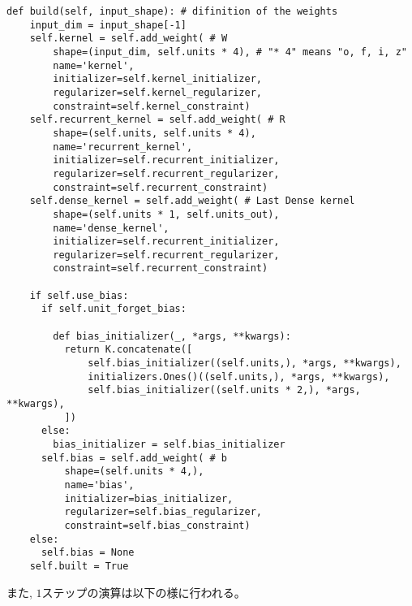 \begin{lstlisting}[caption=独自のリカレントニューラルネットワーク構造の$1$ステップ, label=VLSTMCellSimple]
  def build(self, input_shape): # difinition of the weights
    input_dim = input_shape[-1]
    self.kernel = self.add_weight( # W
        shape=(input_dim, self.units * 4), # "* 4" means "o, f, i, z"
        name='kernel',
        initializer=self.kernel_initializer,
        regularizer=self.kernel_regularizer,
        constraint=self.kernel_constraint)
    self.recurrent_kernel = self.add_weight( # R
        shape=(self.units, self.units * 4),
        name='recurrent_kernel',
        initializer=self.recurrent_initializer,
        regularizer=self.recurrent_regularizer,
        constraint=self.recurrent_constraint)
    self.dense_kernel = self.add_weight( # Last Dense kernel
        shape=(self.units * 1, self.units_out),
        name='dense_kernel',
        initializer=self.recurrent_initializer,
        regularizer=self.recurrent_regularizer,
        constraint=self.recurrent_constraint)

    if self.use_bias:
      if self.unit_forget_bias:

        def bias_initializer(_, *args, **kwargs):
          return K.concatenate([
              self.bias_initializer((self.units,), *args, **kwargs),
              initializers.Ones()((self.units,), *args, **kwargs),
              self.bias_initializer((self.units * 2,), *args, **kwargs),
          ])
      else:
        bias_initializer = self.bias_initializer
      self.bias = self.add_weight( # b
          shape=(self.units * 4,),
          name='bias',
          initializer=bias_initializer,
          regularizer=self.bias_regularizer,
          constraint=self.bias_constraint)
    else:
      self.bias = None
    self.built = True
\end{lstlisting}

また, $1$ステップの演算は以下の様に行われる。

